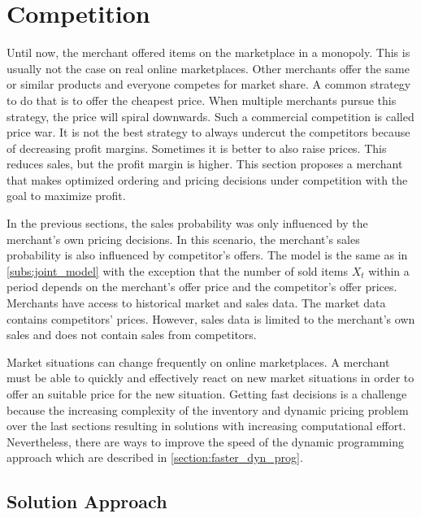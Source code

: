 


\section{Competition}
\label{section:competition}
Until now, the merchant offered items on the marketplace in a monopoly.
This is usually not the case on real online marketplaces.
Other merchants offer the same or similar products and everyone competes for market share.
A common strategy to do that is to offer the cheapest price.
When multiple merchants pursue this strategy, the price will spiral downwards.
Such a commercial competition is called price war.
It is not the best strategy to always undercut the competitors because of decreasing profit margins.
Sometimes it is better to also raise prices.
This reduces sales, but the profit margin is higher.
This section proposes a merchant that makes optimized ordering and pricing decisions under competition with the goal to maximize profit.

In the previous sections, the sales probability was only influenced by the merchant's own pricing decisions.
In this scenario, the merchant's sales probability is also influenced by competitor's offers.
The model is the same as in \cref{subs:joint_model} with the exception that the number of sold items $X_t$ within a period depends on the merchant's offer price and the competitor's offer prices.
Merchants have access to historical market and sales data.
The market data contains competitors' prices.
However, sales data is limited to the merchant's own sales and does not contain sales from competitors.

Market situations can change frequently on online marketplaces.
A merchant must be able to quickly and effectively react on new market situations in order to offer an suitable price for the new situation.
Getting fast decisions is a challenge because the increasing complexity of the inventory and dynamic pricing problem over the last sections resulting in solutions with increasing computational effort.
Nevertheless, there are ways to improve the speed of the dynamic programming approach which are described in \cref{section:faster_dyn_prog}.

\subsection{Solution Approach}


